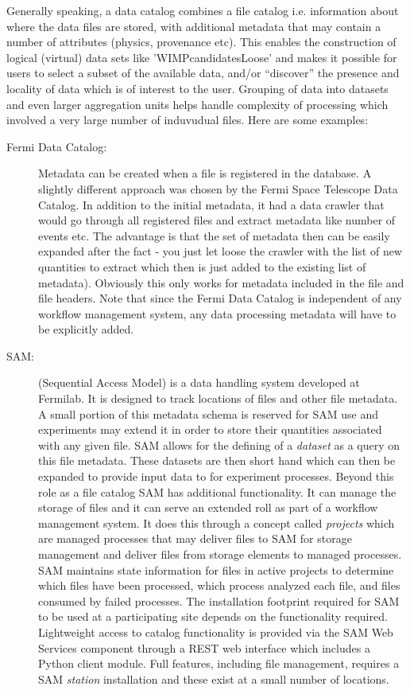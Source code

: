 Generally speaking, a data catalog combines a file catalog i.e. information about where the data files are stored,
with additional metadata that may contain a number of attributes (physics, provenance etc). This enables the construction of logical (virtual)
data sets like 'WIMPcandidatesLoose' and makes it possible for users to select a subset of the available data, and/or ``discover'' the presence and locality of data which
is of interest to the user.
Grouping of data into datasets and even larger aggregation units helps handle complexity of processing which involved a very large number of induvudual files.
Here are some examples:

\begin{description}
\item[Fermi Data Catalog:] Metadata can be created when a file is registered in the database. A slightly
different approach was chosen by the Fermi Space Telescope Data Catalog. In addition to the initial metadata, it had a
data crawler that would go through all registered files and extract metadata like number of events etc. The advantage is
that the set of metadata then can be easily expanded after the fact - you just let loose the crawler with the list
of new quantities to extract which then is just added to the existing list of metadata). Obviously this only works for 
metadata included in the file and file headers.  Note that since the Fermi Data Catalog is independent of any
workflow management system, any data processing metadata will have to be explicitly added. 


\item[SAM:] (Sequential Access Model) is a data handling system
  developed at Fermilab.  It is designed to track locations of files
  and other file metadata.  A small portion of this metadata schema is
  reserved for SAM use and experiments may extend it in order to store
  their quantities associated with any given file.  SAM allows for the
  defining of a \textit{dataset} as a query on this file metadata.
  These datasets are then short hand which can then be expanded to
  provide input data to for experiment processes.  Beyond this role as
  a file catalog SAM has additional functionality.  It can manage the
  storage of files and it can serve an extended roll as part of a workflow
  management system.  It does this through a concept called
  \textit{projects} which are managed processes that may deliver files
  to SAM for storage management and deliver files from storage elements
  to managed processes. SAM maintains state information for files in
  active projects to determine which files have been processed, which process
  analyzed each file, and files consumed by failed processes. The installation footprint required
  for SAM to be used at a participating site depends on the
  functionality required.  Lightweight access to catalog functionality
  is provided via the SAM Web Services component through a REST web
  interface which includes a Python client module.  Full features,
  including file management, requires a SAM \textit{station}
  installation and these exist at a small number of locations.


\end{description}
